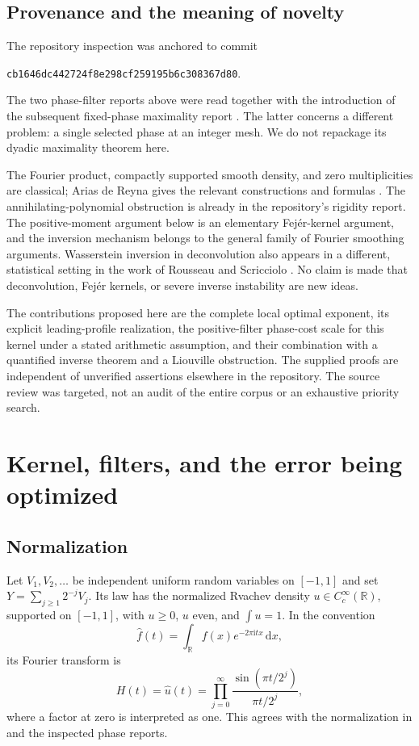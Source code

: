 \documentclass[11pt,a4paper]{article}
\numberwithin{equation}{section}
\theoremstyle{plain}
\theoremstyle{definition}
\theoremstyle{remark}
\newcommand{\R}{\mathbb R}\newcommand{\C}{\mathbb C}
\newcommand{\ii}{\mathrm i}\newcommand{\dd}{\,\mathrm d}
\newcommand{\snapshot}{\texttt{cb1646dc442724f8e298cf259195b6c308367d80}}
\begin{document}
\subsection{Provenance and the meaning of novelty}

The repository inspection was anchored to commit
\begin{center}\small\snapshot.\end{center}
The two phase-filter reports above were read together with the introduction
of the subsequent fixed-phase maximality report \cite{repoFixed}. The latter
concerns a different problem: a single selected phase at an integer mesh.
We do not repackage its dyadic maximality theorem here.

The Fourier product, compactly supported smooth density, and zero
multiplicities are classical; Arias de Reyna gives the relevant constructions
and formulas \cite{arias}. The annihilating-polynomial obstruction is already
in the repository's rigidity report. The positive-moment argument below is
an elementary Fej\'er-kernel argument, and the inversion mechanism belongs to
the general family of Fourier smoothing arguments. Wasserstein inversion in
deconvolution also appears in a different, statistical setting in the work of
Rousseau and Scricciolo \cite{rousseau}. No claim is made that deconvolution,
Fej\'er kernels, or severe inverse instability are new ideas.

The contributions proposed here are the complete local optimal exponent,
its explicit leading-profile realization, the positive-filter phase-cost
scale for this kernel under a stated arithmetic assumption, and their
combination with a quantified inverse theorem and a Liouville obstruction.
The supplied proofs are independent of unverified assertions elsewhere in the
repository. The source review was targeted, not an audit of the entire corpus
or an exhaustive priority search.

\section{Kernel, filters, and the error being optimized}
\label{sec:setup}

\subsection{Normalization}

Let $V_1,V_2,\ldots$ be independent uniform random variables on $[-1,1]$ and
set $Y=\sum_{j\ge1}2^{-j}V_j$. Its law has the normalized Rvachev density
$u\in C_c^\infty(\R)$, supported on $[-1,1]$, with $u\ge0$, $u$ even, and
$\int u=1$. In the convention
\begin{equation}\label{eq:fourier}
 \widehat f(t)=\int_\R f(x)e^{-2\pi\ii tx}\dd x,
\end{equation}
its Fourier transform is
\begin{equation}\label{eq:product}
 H(t)=\widehat u(t)=\prod_{j=0}^{\infty}
 \frac{\sin(\pi t/2^j)}{\pi t/2^j},
\end{equation}
where a factor at zero is interpreted as one. This agrees with the
normalization in \cite{arias} and the inspected phase reports.
\end{document}
